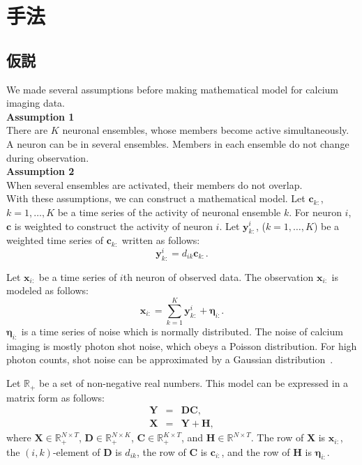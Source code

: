 \chapter{手法}
\section{仮説}
We made several assumptions before making mathematical model for calcium imaging data.
\\
\noindent \textbf{Assumption 1}\\
There are $K$ neuronal ensembles, whose members become active simultaneously.
A neuron can be in several ensembles.
Members in each ensemble do not change during observation.\\
\textbf{Assumption 2}\\
When several ensembles are activated, their members do not overlap.
\\
With these assumptions, we can construct a mathematical model.
Let $\boldsymbol{c}_{k:}$, $k=1,\dots,K$ be a time series of the activity of neuronal ensemble $k$.
For neuron $i$, $\boldsymbol c$ is weighted to construct the activity of neuron $i$.
Let $\boldsymbol{y}^i_{k:}$, ($k = 1, \dots, K$) be a weighted time series of $\boldsymbol{c}_{k:}$ written as follows:
\begin{equation}
  \boldsymbol{y}^i_{k:} = d_{ik} \boldsymbol{c}_{k:}.
  \label{eq:y}
\end{equation}

Let $\boldsymbol{x}_{i:}$ be a time series of $i$th neuron of observed data.
The observation $\boldsymbol{x}_{i:}$ is modeled as follows:
\begin{equation}
  \boldsymbol{x}_{i:} = \sum_{k=1}^K \boldsymbol{y}^i_{k:} + \boldsymbol{\eta}_{i:}.
  \label{eq:x}
\end{equation}
$\boldsymbol{\eta}_{i:}$ is a time series of noise which is normally distributed.
The noise of calcium imaging is mostly photon shot noise, which obeys a Poisson distribution.
For high photon counts, shot noise can be approximated by a Gaussian distribution~\cite{Sjulson2007}.

Let $\mathbb{R}_+$ be a set of non-negative real numbers.
This model can be expressed in a matrix form as follows:
\begin{eqnarray}
  \boldsymbol{Y} &=& \boldsymbol{DC}, \\
  \boldsymbol{X} &=& \boldsymbol{Y} + \boldsymbol{H},
  \label{model_matrix}
\end{eqnarray}
where $\boldsymbol{X} \in \mathbb{R}_+^{N \times T}$, $\boldsymbol{D} \in \mathbb{R}_+^{N \times K}$, $\boldsymbol{C} \in \mathbb{R}_+^{K \times T}$, and $\boldsymbol{H} \in \mathbb{R}^{N \times T}$.
The row of $\boldsymbol X$ is $\boldsymbol{x}_{i:}$, the $(i,k)$-element of $\boldsymbol D$ is $d_{ik}$, the row of $\boldsymbol C$ is $\boldsymbol{c}_{i:}$, and the row of $\boldsymbol H$ is $\boldsymbol{\eta}_{i:}$.

